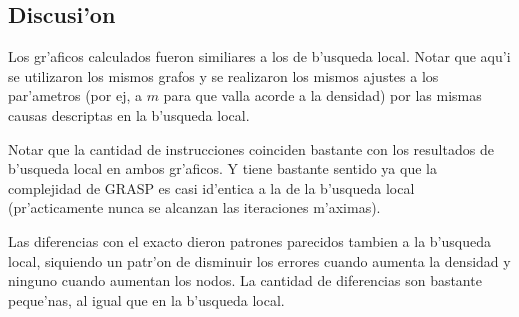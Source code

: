 \subsection{Discusi'on}
Los gr'aficos calculados fueron similiares a los de b'usqueda local. Notar que aqu'i se utilizaron los mismos grafos y se realizaron los mismos ajustes a los par'ametros (por ej, a $m$ para que valla acorde a la densidad) por las mismas causas descriptas en la b'usqueda local.

Notar que la cantidad de instrucciones coinciden bastante con los resultados de b'usqueda local en ambos gr'aficos. Y tiene bastante sentido ya que la complejidad de GRASP es casi id'entica a la de la b'usqueda local (pr'acticamente nunca se alcanzan las iteraciones m'aximas).

Las diferencias con el exacto dieron patrones parecidos tambien a la b'usqueda local, siquiendo un patr'on de disminuir los errores cuando aumenta la densidad y ninguno cuando aumentan los nodos. La cantidad de diferencias son bastante peque'nas, al igual que en la b'usqueda local.

